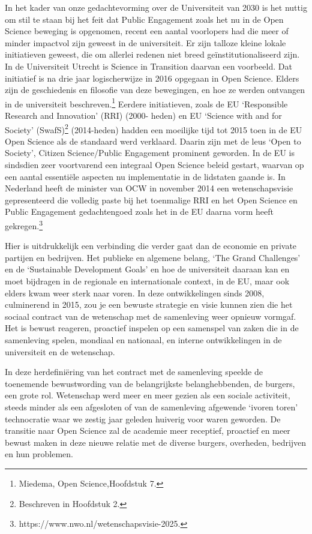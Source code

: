 \documentclass{jote-book}
\begin{document}
	In het kader van onze gedachtevorming over de Universiteit van 2030 is het nuttig om stil te staan bij het feit dat Public Engagement zoals het nu in de Open Science beweging is opgenomen, recent een aantal voorlopers had die meer of minder impactvol zijn geweest in de universiteit. Er zijn talloze kleine lokale initiatieven geweest, die om allerlei redenen niet breed geïnstitutionaliseerd zijn. In de Universiteit Utrecht is Science in Transition daarvan een voorbeeld. Dat initiatief is na drie jaar logischerwijze in 2016 opgegaan in Open Science. Elders zijn de geschiedenis en filosofie van deze bewegingen, en hoe ze werden ontvangen in de universiteit beschreven.\footnote{Miedema, Open Science,Hoofdstuk 7. } Eerdere initiatieven, zoals de EU ‘Responsible Research and Innovation' (RRI) (2000- heden) en EU ‘Science with and for Society' (SwafS)\footnote{Beschreven in Hoofdstuk 2.} (2014-heden) hadden een moeilijke tijd tot 2015 toen in de EU Open Science als de standaard werd verklaard. Daarin zijn met de leus ‘Open to Society', Citizen Science/Public Engagement prominent geworden. In de EU is sindsdien zeer voortvarend een integraal Open Science beleid gestart, waarvan op een aantal essentiële aspecten nu implementatie in de lidstaten gaande is. In Nederland heeft de minister van OCW in november 2014 een wetenschapsvisie gepresenteerd die volledig paste bij het toenmalige RRI en het Open Science en Public Engagement gedachtengoed zoals het in de EU daarna vorm heeft gekregen.\footnote{https://www.nwo.nl/wetenschapsvisie-2025.}



	Hier is uitdrukkelijk een verbinding die verder gaat dan de economie en private partijen en bedrijven. Het publieke en algemene belang, ‘The Grand Challenges' en de ‘Sustainable Development Goals' en hoe de universiteit daaraan kan en moet bijdragen in de regionale en internationale context, in de EU, maar ook elders kwam weer sterk naar voren. In deze ontwikkelingen sinds 2008, culminerend in 2015, zou je een bewuste strategie en visie kunnen zien die het sociaal contract van de wetenschap met de samenleving weer opnieuw vormgaf. Het is bewust reageren, proactief inspelen op een samenspel van zaken die in de samenleving spelen, mondiaal en nationaal, en interne ontwikkelingen in de universiteit en de wetenschap.



	In deze herdefiniëring van het contract met de samenleving speelde de toenemende bewustwording van de belangrijkste belanghebbenden, de burgers, een grote rol. Wetenschap werd meer en meer gezien als een sociale activiteit, steeds minder als een afgesloten of van de samenleving afgewende ‘ivoren toren' technocratie waar we zestig jaar geleden huiverig voor waren geworden. De transitie naar Open Science zal de academie meer receptief, proactief en meer bewust maken in deze nieuwe relatie met de diverse burgers, overheden, bedrijven en hun problemen.
\end{document}
